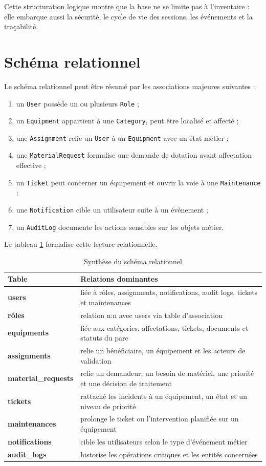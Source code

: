 Cette structuration logique montre que la base ne se limite pas à l'inventaire : elle embarque aussi la sécurité, le cycle de vie des sessions, les événements et la traçabilité.

\section{Schéma relationnel}
Le schéma relationnel peut être résumé par les associations majeures suivantes :
\begin{enumerate}
  \item un \texttt{User} possède un ou plusieurs \texttt{Role} ;
  \item un \texttt{Equipment} appartient à une \texttt{Category}, peut être localisé et affecté ;
  \item une \texttt{Assignment} relie un \texttt{User} à un \texttt{Equipment} avec un état métier ;
  \item une \texttt{MaterialRequest} formalise une demande de dotation avant affectation effective ;
  \item un \texttt{Ticket} peut concerner un équipement et ouvrir la voie à une \texttt{Maintenance} ;
  \item une \texttt{Notification} cible un utilisateur suite à un événement ;
  \item un \texttt{AuditLog} documente les actions sensibles sur les objets métier.
\end{enumerate}

Le tableau \ref{tab:schema-relationnel} formalise cette lecture relationnelle.

\begin{table}[H]
\centering
\caption{Synthèse du schéma relationnel}
\label{tab:schema-relationnel}
\begin{tabularx}{\textwidth}{>{\bfseries}p{3cm}X}
\toprule
Table & Relations dominantes \\
\midrule
users & liée à rôles, assignments, notifications, audit logs, tickets et maintenances \\
rôles & relation n:n avec users via table d'association \\
equipments & liée aux catégories, affectations, tickets, documents et statuts du parc \\
assignments & relie un bénéficiaire, un équipement et les acteurs de validation \\
material\_requests & relie un demandeur, un besoin de matériel, une priorité et une décision de traitement \\
tickets & rattaché les incidents à un équipement, un état et un niveau de priorité \\
maintenances & prolonge le ticket ou l'intervention planifiée sur un équipement \\
notifications & cible les utilisateurs selon le type d'événement métier \\
audit\_logs & historise les opérations critiques et les entités concernées \\
\bottomrule
\end{tabularx}
\end{table}

